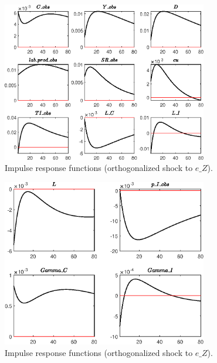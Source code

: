 \begin{figure}[H]
\centering 
\includegraphics[width=0.80\textwidth]{directed_search/graphs/directed_search_IRF_e_Z1}
\caption{Impulse response functions (orthogonalized shock to $e\_Z$).}\label{Fig:IRF:e_Z:1}
\end{figure}
 
\begin{figure}[H]
\centering 
\includegraphics[width=0.80\textwidth]{directed_search/graphs/directed_search_IRF_e_Z2}
\caption{Impulse response functions (orthogonalized shock to $e\_Z$).}\label{Fig:IRF:e_Z:2}
\end{figure}
 
